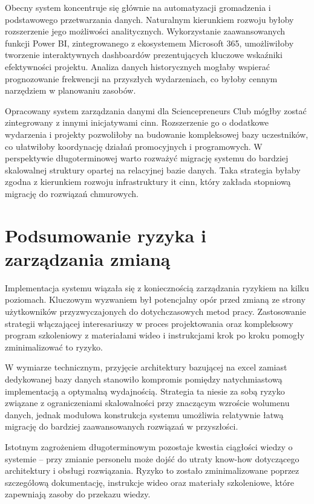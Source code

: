 Obecny system koncentruje się głównie na automatyzacji gromadzenia i podstawowego przetwarzania danych. Naturalnym kierunkiem rozwoju byłoby rozszerzenie jego możliwości analitycznych. Wykorzystanie zaawansowanych funkcji Power BI, zintegrowanego z ekosystemem Microsoft 365, umożliwiłoby tworzenie interaktywnych dashboardów prezentujących kluczowe wskaźniki efektywności projektu.
Analiza danych historycznych mogłaby wspierać prognozowanie frekwencji na przyszłych wydarzeniach, co byłoby cennym narzędziem w planowaniu zasobów. 

Opracowany system zarządzania danymi dla Sciencepreneurs Club mógłby zostać zintegrowany z innymi inicjatywami \gls{cinn}. Rozszerzenie go o dodatkowe wydarzenia i projekty pozwoliłoby na budowanie kompleksowej bazy uczestników, co ułatwiłoby koordynację działań promocyjnych i programowych. W perspektywie długoterminowej warto rozważyć migrację systemu do bardziej skalowalnej struktury opartej na relacyjnej bazie danych. Taka strategia byłaby zgodna z kierunkiem rozwoju infrastruktury \gls{it} \gls{cinn}, który zakłada stopniową migrację do rozwiązań chmurowych.

\section{Podsumowanie ryzyka i zarządzania zmianą}

Implementacja systemu wiązała się z koniecznością zarządzania ryzykiem na kilku poziomach. Kluczowym wyzwaniem był potencjalny opór przed zmianą ze strony użytkowników przyzwyczajonych do dotychczasowych metod pracy. Zastosowanie strategii włączającej interesariuszy w proces projektowania oraz kompleksowy program szkoleniowy z materiałami wideo i instrukcjami krok po kroku pomogły zminimalizować to ryzyko.

W wymiarze technicznym, przyjęcie architektury bazującej na \gls{excel} zamiast dedykowanej bazy danych stanowiło kompromis pomiędzy natychmiastową implementacją a optymalną wydajnością. Strategia ta niesie za sobą ryzyko związane z ograniczeniami skalowalności przy znaczącym wzroście wolumenu danych, jednak modułowa konstrukcja systemu umożliwia relatywnie łatwą migrację do bardziej zaawansowanych rozwiązań w przyszłości.

Istotnym zagrożeniem długoterminowym pozostaje kwestia ciągłości wiedzy o systemie – przy zmianie personelu może dojść do utraty know-how dotyczącego architektury i obsługi rozwiązania. Ryzyko to zostało zminimalizowane poprzez szczegółową dokumentację, instrukcje wideo oraz materiały szkoleniowe, które zapewniają zasoby do przekazu wiedzy.

